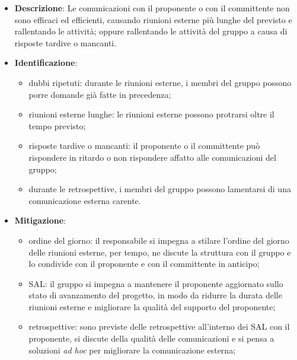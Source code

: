 \label{risk:comunicazione esterna carente}
\begin{itemize}
	\item \textbf{Descrizione}:
	      Le comunicazioni con il proponente o con il committente non sono
	      efficaci ed efficienti, causando riunioni esterne più lunghe del
	      previsto e rallentando le attività; oppure rallentando le attività
	      del gruppo a causa di risposte tardive o mancanti.

	\item \textbf{Identificazione}:
	      \begin{itemize}
		      \item dubbi ripetuti: durante le riunioni esterne, i membri del
		            gruppo possono porre domande già fatte in precedenza;

		      \item riunioni esterne lunghe: le riunioni esterne possono
		            protrarsi oltre il tempo previsto;

		      \item risposte tardive o mancanti: il proponente o il committente
		            può rispondere in ritardo o non rispondere affatto alle
		            comunicazioni del gruppo;

		      \item durante le retrospettive, i membri del gruppo possono
		            lamentarsi di una comunicazione esterna carente.
	      \end{itemize}

	\item \textbf{Mitigazione}:
	      \begin{itemize}
		      \item ordine del giorno: il responsabile si impegna a stilare
		            l'ordine del giorno delle riunioni esterne, per tempo, ne
		            discute la struttura con il gruppo e lo condivide con il
		            proponente e con il committente in anticipo;

		      \item SAL: il gruppo si impegna a mantenere il
		            proponente aggiornato sullo stato di avanzamento del progetto,
		            in modo da ridurre la durata delle riunioni esterne e
		            migliorare la qualità del supporto del proponente;

		      \item retrospettive: sono previste delle retrospettive
		            all'interno dei SAL con il proponente, si discute della
		            qualità delle comunicazioni e si pensa a soluzioni
		            \textit{ad hoc} per migliorare la comunicazione esterna;


\end{itemize}
\end{itemize}
